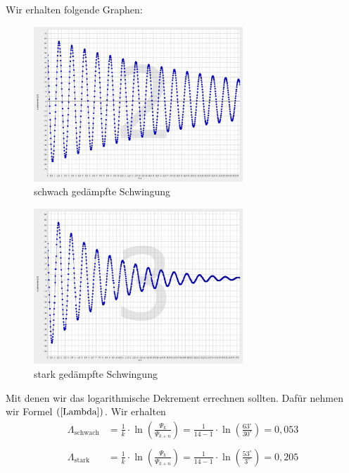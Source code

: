 \documentclass[fontsize=12pt]{scrartcl}
\begin{document}
Wir erhalten folgende Graphen:
\begin{figure}[H]
\centering
\vspace{-10pt}
                \includegraphics[width=0.7\textwidth]{Graphik/RobinGenti0,2}
                \caption{schwach gedämpfte Schwingung}
                \label{7}
\end{figure}
\vspace{-10pt}
\begin{figure}[H]
\centering
\vspace{-10pt}
                \includegraphics[width=0.7\textwidth]{Graphik/RobinGenti0,4}
                \caption{stark gedämpfte Schwingung}
                \label{8}
\end{figure}
\vspace{-10pt}
\newpage
Mit denen wir das logarithmische Dekrement errechnen sollten. Dafür nehmen wir Formel $(\ref{Lambda})$. Wir erhalten
\begin{align*}
\Lambda_{\text{schwach}} &= \frac{1}{k} \cdot \ln(\frac{\Psi_k}{\Psi_{k+n}})=\frac{1}{14-1} \cdot \ln(\frac{63^{\circ}}{30^{\circ}})=0,053 \\
~\\
\Lambda_{\text{stark}} &= \frac{1}{k} \cdot \ln(\frac{\Psi_k}{\Psi_{k+n}})=\frac{1}{14-1} \cdot \ln(\frac{53^{\circ}}{3^{\circ}})=0,205
\end{align*}
\end{document}
